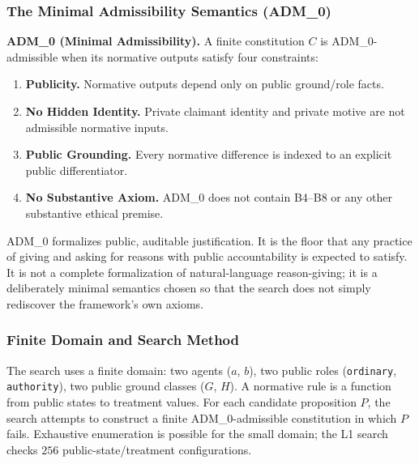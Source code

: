 \documentclass[11pt]{article}
\def\ensuremath#1{#1}%
\def\mathrm#1{#1}%
\newcommand{\ADM}{\texorpdfstring{\ensuremath{\mathrm{ADM}_0}}{ADM0}}
\begin{document}
\subsubsection{The Minimal Admissibility Semantics (\ADM{})}
\begin{paperbox}
\textbf{\ADM{} (Minimal Admissibility).} A finite constitution $C$ is \ADM{}-admissible when its normative outputs satisfy four constraints:
\begin{enumerate}[label=(\alph*)]
\item \textbf{Publicity.} Normative outputs depend only on public ground/role facts.
\item \textbf{No Hidden Identity.} Private claimant identity and private motive are not admissible normative inputs.
\item \textbf{Public Grounding.} Every normative difference is indexed to an explicit public differentiator.
\item \textbf{No Substantive Axiom.} \ADM{} does not contain B4--B8 or any other substantive ethical premise.
\end{enumerate}
\end{paperbox}
\ADM{} formalizes public, auditable justification. It is the floor that any practice of giving and asking for reasons with public accountability is expected to satisfy. It is not a complete formalization of natural-language reason-giving; it is a deliberately minimal semantics chosen so that the search does not simply rediscover the framework's own axioms.

\subsubsection{Finite Domain and Search Method}
The search uses a finite domain: two agents ($a$, $b$), two public roles (\texttt{ordinary}, \texttt{authority}), two public ground classes ($G$, $H$). A normative rule is a function from public states to treatment values. For each candidate proposition $P$, the search attempts to construct a finite \ADM{}-admissible constitution in which $P$ fails. Exhaustive enumeration is possible for the small domain; the L1 search checks $256$ public-state/treatment configurations.
\end{document}
